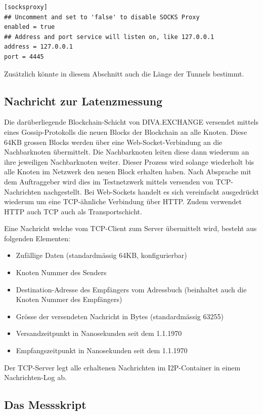 \begin{lstlisting}
[socksproxy]
## Uncomment and set to 'false' to disable SOCKS Proxy
enabled = true
## Address and port service will listen on, like 127.0.0.1
address = 127.0.0.1
port = 4445
\end{lstlisting}

Zusätzlich könnte in diesem Abschnitt auch die Länge der Tunnels bestimmt.

\subsection{Nachricht zur Latenzmessung}\label{sec:nachricht_latenzmessung}

Die darüberliegende Blockchain-Schicht von DIVA.EXCHANGE versendet mittels eines Gossip-Protokolls die neuen Blocks der Blockchain an alle Knoten.
Diese 64KB grossen Blocks werden über eine Web-Socket-Verbindung an die Nachbarknoten übermittelt.
Die Nachbarknoten leiten diese dann wiederum an ihre jeweiligen Nachbarknoten weiter.
Dieser Prozess wird solange wiederholt bis alle Knoten im Netzwerk den neuen Block erhalten haben.
Nach Absprache mit dem Auftraggeber wird dies im Testnetzwerk mittels versenden von TCP-Nachrichten nachgestellt.
Bei Web-Sockets handelt es sich vereinfacht ausgedrückt wiederum um eine TCP-ähnliche Verbindung über HTTP. Zudem verwendet HTTP auch TCP auch als Transportschicht.

Eine Nachricht welche vom TCP-Client zum Server übermittelt wird, besteht aus folgenden Elementen:

\begin{itemize}
    \item Zufällige Daten (standardmässig 64KB, konfigurierbar)
    \item Knoten Nummer des Senders
    \item Destination-Adresse des Empfängers vom Adressbuch (beinhaltet auch die Knoten Nummer des Empfängers)
    \item Grösse der versendeten Nachricht in Bytes (standardmässig 63255)
    \item Versandzeitpunkt in Nanosekunden seit dem 1.1.1970
    \item Empfangszeitpunkt in Nanosekunden seit dem 1.1.1970
\end{itemize}

Der TCP-Server legt alle erhaltenen Nachrichten im I2P-Container in einem Nachrichten-Log ab.

\subsection{Das Messskript}\label{sec:messskript}

